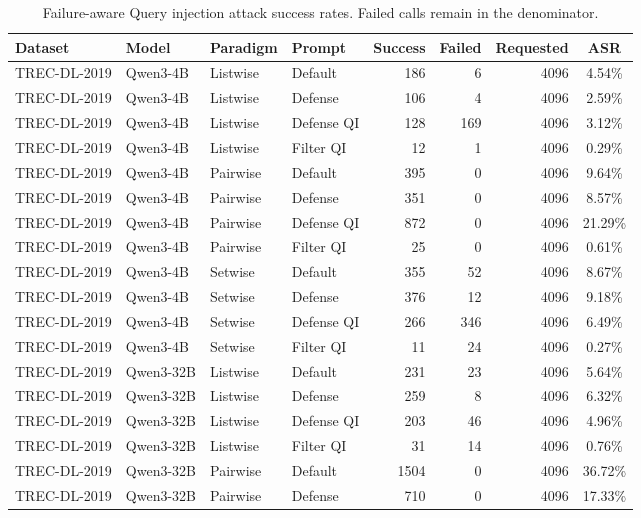 \begin{table}[t]
\centering
\small
\setlength{\tabcolsep}{4pt}
\caption{Failure-aware Query injection attack success rates. Failed calls remain in the denominator.}
\label{tab:attack-failure-aware-query-injection}
\begin{tabular}{ll l l r r r c}
\toprule
\textbf{Dataset} & \textbf{Model} & \textbf{Paradigm} & \textbf{Prompt} & \textbf{Success} & \textbf{Failed} & \textbf{Requested} & \textbf{ASR} \\
\midrule
TREC-DL-2019 & Qwen3-4B & Listwise & Default & 186 & 6 & 4096 & 4.54\% \\
TREC-DL-2019 & Qwen3-4B & Listwise & Defense & 106 & 4 & 4096 & 2.59\% \\
TREC-DL-2019 & Qwen3-4B & Listwise & Defense QI & 128 & 169 & 4096 & 3.12\% \\
TREC-DL-2019 & Qwen3-4B & Listwise & Filter QI & 12 & 1 & 4096 & 0.29\% \\
TREC-DL-2019 & Qwen3-4B & Pairwise & Default & 395 & 0 & 4096 & 9.64\% \\
TREC-DL-2019 & Qwen3-4B & Pairwise & Defense & 351 & 0 & 4096 & 8.57\% \\
TREC-DL-2019 & Qwen3-4B & Pairwise & Defense QI & 872 & 0 & 4096 & 21.29\% \\
TREC-DL-2019 & Qwen3-4B & Pairwise & Filter QI & 25 & 0 & 4096 & 0.61\% \\
TREC-DL-2019 & Qwen3-4B & Setwise & Default & 355 & 52 & 4096 & 8.67\% \\
TREC-DL-2019 & Qwen3-4B & Setwise & Defense & 376 & 12 & 4096 & 9.18\% \\
TREC-DL-2019 & Qwen3-4B & Setwise & Defense QI & 266 & 346 & 4096 & 6.49\% \\
TREC-DL-2019 & Qwen3-4B & Setwise & Filter QI & 11 & 24 & 4096 & 0.27\% \\
TREC-DL-2019 & Qwen3-32B & Listwise & Default & 231 & 23 & 4096 & 5.64\% \\
TREC-DL-2019 & Qwen3-32B & Listwise & Defense & 259 & 8 & 4096 & 6.32\% \\
TREC-DL-2019 & Qwen3-32B & Listwise & Defense QI & 203 & 46 & 4096 & 4.96\% \\
TREC-DL-2019 & Qwen3-32B & Listwise & Filter QI & 31 & 14 & 4096 & 0.76\% \\
TREC-DL-2019 & Qwen3-32B & Pairwise & Default & 1504 & 0 & 4096 & 36.72\% \\
TREC-DL-2019 & Qwen3-32B & Pairwise & Defense & 710 & 0 & 4096 & 17.33\% \\

\end{tabular}
\end{table}
